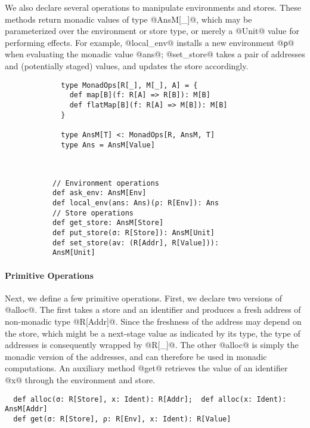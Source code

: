 We also declare several operations to manipulate environments and
stores. These methods return monadic values of type @AnsM[_]@, which
may be parameterized over the environment or store type, or merely a @Unit@
value for performing effects. For example, @local_env@ installs a new environment
@ρ@ when evaluating the monadic value @ans@; @set_store@ takes a pair of
addresses and (potentially staged) values, and updates the store accordingly.

\begin{figure}[h!]
  \centering
\vspace{-1em}
  \begin{subfigure}[b]{0.45\textwidth}
    \begin{lstlisting}
  type MonadOps[R[_], M[_], A] = {
    def map[B](f: R[A] => R[B]): M[B]
    def flatMap[B](f: R[A] => M[B]): M[B]
  }

  type AnsM[T] <: MonadOps[R, AnsM, T]
  type Ans = AnsM[Value]
    \end{lstlisting}
  \end{subfigure}
  ~
  \begin{subfigure}[b]{0.55\textwidth}
    \begin{lstlisting}
// Environment operations
def ask_env: AnsM[Env]
def local_env(ans: Ans)(ρ: R[Env]): Ans
// Store operations
def get_store: AnsM[Store]
def put_store(σ: R[Store]): AnsM[Unit]
def set_store(av: (R[Addr], R[Value])): AnsM[Unit]
    \end{lstlisting}
  \end{subfigure}
\end{figure}
\vspace{-1em}

\paragraph{Primitive Operations} Next, we define a few primitive operations.
First, we declare two versions of @alloc@. The first takes a store and an
identifier and produces a fresh address of non-monadic type @R[Addr]@. Since
the freshness of the address may depend on the store, which might be a
next-stage value as indicated by its type, the type of addresses is
consequently wrapped by @R[_]@. The other @alloc@ is simply the monadic version
of the addresses, and can therefore be used in monadic computations.
An auxiliary method @get@ retrieves the value of an identifier @x@ through the
environment and store.
\begin{lstlisting}
  def alloc(σ: R[Store], x: Ident): R[Addr];  def alloc(x: Ident): AnsM[Addr]
  def get(σ: R[Store], ρ: R[Env], x: Ident): R[Value]
\end{lstlisting}

